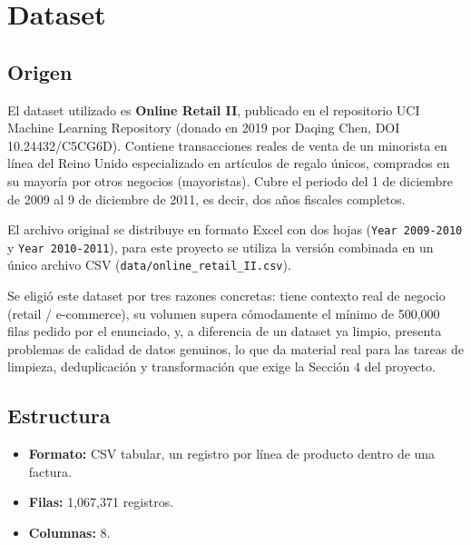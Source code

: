\section{Dataset}
\label{sec:dataset}

\subsection{Origen}

El dataset utilizado es \textbf{Online Retail II}, publicado en el repositorio UCI Machine Learning Repository (donado en 2019 por Daqing Chen, DOI 10.24432/C5CG6D). Contiene transacciones reales de venta de un minorista en línea del Reino Unido especializado en artículos de regalo únicos, comprados en su mayoría por otros negocios (mayoristas). Cubre el periodo del 1 de diciembre de 2009 al 9 de diciembre de 2011, es decir, dos años fiscales completos.

El archivo original se distribuye en formato Excel con dos hojas (\texttt{Year 2009-2010} y \texttt{Year 2010-2011}), para este proyecto se utiliza la versión combinada en un único archivo CSV (\texttt{data/online\_retail\_II.csv}).

Se eligió este dataset por tres razones concretas: tiene contexto real de negocio (retail / e-commerce), su volumen supera cómodamente el mínimo de 500{,}000 filas pedido por el enunciado, y, a diferencia de un dataset ya limpio, presenta problemas de calidad de datos genuinos, lo que da material real para las tareas de limpieza, deduplicación y transformación que exige la Sección 4 del proyecto.

\subsection{Estructura}

\begin{itemize}
    \item \textbf{Formato:} CSV tabular, un registro por línea de producto dentro de una factura.
    \item \textbf{Filas:} 1{,}067{,}371 registros.
    \item \textbf{Columnas:} 8.
\end{itemize}

